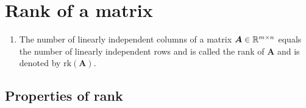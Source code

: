 \section{Rank of a matrix}

\begin{enumerate}
    \item 
    \begin{definition}
        The number of linearly independent columns of a matrix $\bm{A} \in \mathbb{R}^{m\times n}$ equals the number of linearly independent rows and is called the rank of $\bm{A}$ and is denoted by $\text{rk}(\bm{A})$.
        \hfill \cite{mfml/book/mml/Deisenroth-Faisal-Ong}
    \end{definition}

\end{enumerate}


\subsection{Properties of rank}

